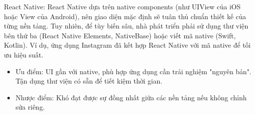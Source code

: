    \begin{flushleft}
      \hspace*{0.8cm}React Native: React Native dựa trên native components (như UIView của iOS hoặc View của Android), nên giao diện mặc định sẽ tuân thủ chuẩn thiết kế của từng nền tảng. Tuy nhiên, để tùy biến sâu, nhà phát triển phải sử dụng thư viện bên thứ ba (React Native Elements, NativeBase) hoặc viết mã native (Swift, Kotlin). Ví dụ, ứng dụng Instagram đã kết hợp React Native với mã native để tối ưu hiệu suất.
      \setlength{\leftmargini}{1.5cm}
      \begin{itemize}
          \item Ưu điểm: UI gần với native, phù hợp ứng dụng cần trải nghiệm "nguyên bản". Tận dụng thư viện có sẵn để tiết kiệm thời gian.
          \item Nhược điểm: Khó đạt được sự đồng nhất giữa các nền tảng nếu không chỉnh sửa riêng.
      \end{itemize}
    \end{flushleft}